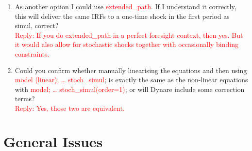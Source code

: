 \documentclass[10pt,math=newtx,citestyle=gb7714-2015,bibstyle=gb7714-2015]{elegantbook}
\begin{document}
{{{\begin{enumerate}
{			the use of piece-wise linearity in Occbin for the particular type of problem eases computations. But if you find a solution, then the results should be the same.}
		\item As another option I could use \textcolor{red}{extended\_path}. If I understand it correctly, this will deliver the same IRFs to a one-time shock in the first period as simul, correct?\\
		\textcolor{red}{Reply: If you do extended\_path in a perfect foresight context, then yes. But it would also allow for stochastic shocks together with occasionally binding constraints.}
		\item Could you confirm whether manually linearising the equations and then using \textcolor{red}{model (linear); … stoch\_simul}; is exactly the same as the non-linear equations with \textcolor{red}{model; … stoch\_simul(order=1)}; or will Dynare include some correction terms?\\
		\textcolor{red}{Reply:
			Yes, those two are equivalent.
		}
		
	\end{enumerate}
	
	\section{General Issues}
	
}}}
\end{document}
